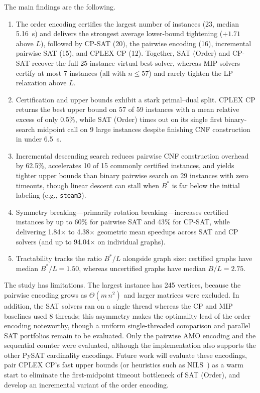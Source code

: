 \documentclass[a4paper,fleqn]{cas-sc}
\begin{document}
The main findings are the following.
\begin{enumerate}
    \item The order encoding certifies the largest number of instances (23, median 5.16~s) and delivers the strongest average lower-bound tightening ($+1.71$ above $L$), followed by CP-SAT (20), the pairwise encoding (16), incremental pairwise SAT (15), and CPLEX CP (12). Together, SAT (Order) and CP-SAT recover the full 25-instance virtual best solver, whereas MIP solvers certify at most 7 instances (all with $n\le57$) and rarely tighten the LP relaxation above $L$.
    \item Certification and upper bounds exhibit a stark primal--dual split. CPLEX CP returns the best upper bound on 57 of 59 instances with a mean relative excess of only 0.5\%, while SAT (Order) times out on its single first binary-search midpoint call on 9 large instances despite finishing CNF construction in under 6.5~s.
    \item Incremental descending search reduces pairwise CNF construction overhead by 62.5\%, accelerates 10 of 15 commonly certified instances, and yields tighter upper bounds than binary pairwise search on 29 instances with zero timeouts, though linear descent can stall when $B^*$ is far below the initial labeling (e.g., \texttt{steam3}).
    \item Symmetry breaking---primarily rotation breaking---increases certified instances by up to 60\% for pairwise SAT and 43\% for CP-SAT, while delivering 1.84$\times$ to 4.38$\times$ geometric mean speedups across SAT and CP solvers (and up to 94.04$\times$ on individual graphs).
    \item Tractability tracks the ratio $B^*/L$ alongside graph size: certified graphs have median $B^*/L=1.50$, whereas uncertified graphs have median $B/L=2.75$.
\end{enumerate}

The study has limitations. The largest instance has 245 vertices, because the pairwise encoding grows as $\Theta(m\,n^2)$ and larger matrices were excluded. In addition, the SAT solvers ran on a single thread whereas the CP and MIP baselines used 8 threads; this asymmetry makes the optimality lead of the order encoding noteworthy, though a uniform single-threaded comparison and parallel SAT portfolios remain to be evaluated. Only the pairwise AMO encoding and the sequential counter were evaluated, although the implementation also supports the other PySAT cardinality encodings. Future work will evaluate these encodings, pair CPLEX CP's fast upper bounds (or heuristics such as NILS~\citep{ren2020nils}) as a warm start to eliminate the first-midpoint timeout bottleneck of SAT (Order), and develop an incremental variant of the order encoding.
\end{document}
